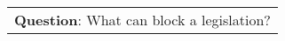 \begin{figure*}[ht]
{\begin{tabular}{p{}}
            \textbf{Question}: What can block a legislation?                                                                                                                                                                                                                                                                                                                                                                                                                                                                                                                                                                                                                                                                                                                                                                                                                                                                                                                                                                                                                                                                                                                                                                                                                                                                                                                                                                                                                                                                                                                                                                                                                                                                                                           \\

\end{tabular}}
\end{figure*}
